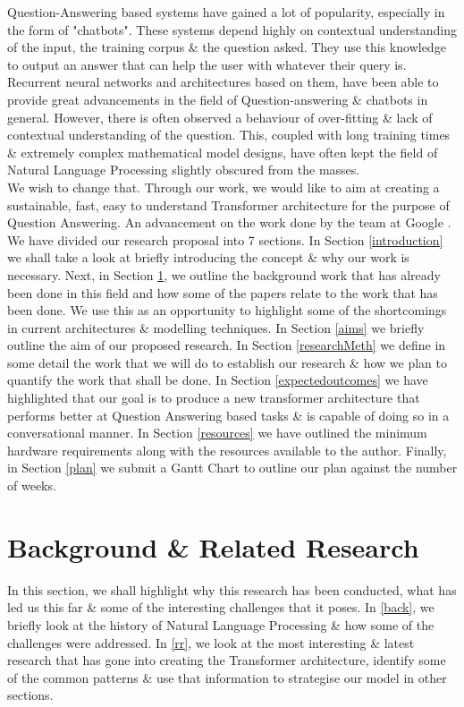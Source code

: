 \documentclass[11pt]{article}
\begin{document}
	Question-Answering based systems have gained a lot of popularity, especially in the form of "chatbots". These systems depend highly on contextual understanding of the input, the training corpus \& the question asked. They use this knowledge to output an answer that can help the user with whatever their query is. Recurrent neural networks and architectures based on them, have been able to provide great advancements in the field of Question-answering \& chatbots in general. However, there is often observed a behaviour of over-fitting \& lack of contextual understanding of the question. This, coupled with long training times \& extremely complex mathematical model designs, have often kept the field of Natural Language Processing slightly obscured from the masses. 
	\\ We wish to change that. Through our work, we would like to aim at creating a sustainable, fast, easy to understand Transformer architecture for the purpose of Question Answering. An advancement on the work done by the team at Google \citep{atayl}.
	We have divided our research proposal into 7 sections.
	In Section \ref{introduction} we shall take a look at briefly introducing the concept \& why our work is necessary. Next, in Section \ref{backRR}, we outline the background work that has already been done in this field and how some of the papers relate to the work that has been done. We use this as an opportunity to highlight some of the shortcomings in current architectures \& modelling techniques. In Section \ref{aims} we briefly outline the aim of our proposed research. In Section \ref{researchMeth} we define in some detail the work that we will do to establish our research \& how we plan to quantify the work that shall be done. In Section \ref{expectedoutcomes} we have highlighted that our goal is to produce a new transformer architecture that performs better at Question Answering based tasks \& is capable of doing so in a conversational manner.
	In Section \ref{resources} we have outlined the minimum hardware requirements along with the resources available to the author. Finally, in Section \ref{plan} we submit a Gantt Chart to outline our plan against the number of weeks.
	
	\section{Background \& Related Research}\label{backRR}
	In this section, we shall highlight why this research has been conducted, what has led us this far \& some of the interesting challenges that it poses. In \ref{back}, we briefly look at the history of Natural Language Processing \& how some of the challenges were addressed. In \ref{rr}, we look at the most interesting \& latest research that has gone into creating the Transformer architecture, identify some of the common patterns \& use that information to strategise our model in other sections.
\end{document}
